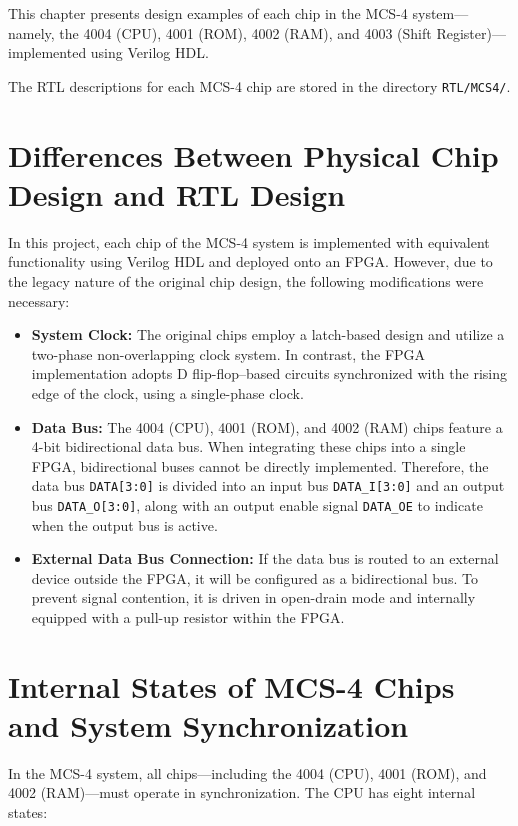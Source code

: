 This chapter presents design examples of each chip in the MCS-4 system—namely, the 4004 (CPU), 4001 (ROM), 4002 (RAM), and 4003 (Shift Register)—implemented using Verilog HDL.

The RTL descriptions for each MCS-4 chip are stored in the directory \texttt{RTL/MCS4/}.
\section{Differences Between Physical Chip Design and RTL Design}
In this project, each chip of the MCS-4 system is implemented with equivalent functionality using Verilog HDL and deployed onto an FPGA. However, due to the legacy nature of the original chip design, the following modifications were necessary:

\begin{itemize}
  \item \textbf{System Clock:}  
  The original chips employ a latch-based design and utilize a two-phase non-overlapping clock system. In contrast, the FPGA implementation adopts D flip-flop–based circuits synchronized with the rising edge of the clock, using a single-phase clock.

  \item \textbf{Data Bus:}  
  The 4004 (CPU), 4001 (ROM), and 4002 (RAM) chips feature a 4-bit bidirectional data bus. When integrating these chips into a single FPGA, bidirectional buses cannot be directly implemented. Therefore, the data bus \texttt{DATA[3:0]} is divided into an input bus \texttt{DATA\_I[3:0]} and an output bus \texttt{DATA\_O[3:0]}, along with an output enable signal \texttt{DATA\_OE} to indicate when the output bus is active.

  \item \textbf{External Data Bus Connection:}  
  If the data bus is routed to an external device outside the FPGA, it will be configured as a bidirectional bus. To prevent signal contention, it is driven in open-drain mode and internally equipped with a pull-up resistor within the FPGA.
\end{itemize}
\section{Internal States of MCS-4 Chips and System Synchronization}
In the MCS-4 system, all chips—including the 4004 (CPU), 4001 (ROM), and 4002 (RAM)—must operate in synchronization. The CPU has eight internal states:

